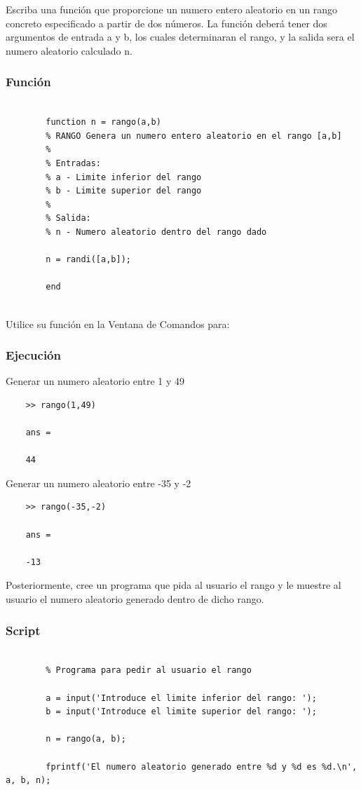\documentclass{article}
\begin{document}
	Escriba una función que proporcione un numero entero aleatorio en un rango concreto especificado a partir de dos números. La función deberá tener dos argumentos de entrada a y b, los cuales determinaran el rango, y la salida sera el numero aleatorio calculado n.
	
	\subsubsection{Función}
	
	\begin{lstlisting}
		
		function n = rango(a,b)
		% RANGO Genera un numero entero aleatorio en el rango [a,b]
		%
		% Entradas:
		% a - Limite inferior del rango
		% b - Limite superior del rango
		%
		% Salida:
		% n - Numero aleatorio dentro del rango dado
		
		n = randi([a,b]);
		
		end
		
	\end{lstlisting}
	
	Utilice su función en la Ventana de Comandos para:
	
	\subsubsection{Ejecución}
	
	Generar un numero aleatorio entre 1 y 49
	
	\begin{lstlisting}
	>> rango(1,49)
	
	ans =
	
	44
	\end{lstlisting}
	
	Generar un numero aleatorio entre -35 y -2
	
	\begin{lstlisting}
	>> rango(-35,-2)
		
	ans =
	
	-13
	\end{lstlisting}
	
	Posteriormente, cree un programa que pida al usuario el rango y le muestre al usuario el numero aleatorio generado dentro de dicho rango.
	
	\subsubsection{Script}
	
	\begin{lstlisting}
		
		% Programa para pedir al usuario el rango
		
		a = input('Introduce el limite inferior del rango: ');
		b = input('Introduce el limite superior del rango: ');
		
		n = rango(a, b);
		
		fprintf('El numero aleatorio generado entre %d y %d es %d.\n', a, b, n);
		
	\end{lstlisting}
	
\end{document}
